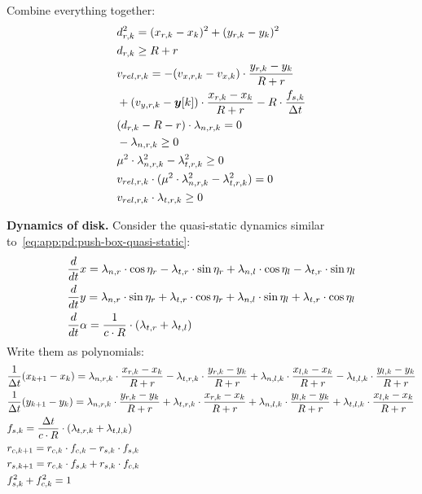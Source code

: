 Combine everything together:
\begin{align}
    & \dr[k]^2 = (\xr[k] - \x[k])^2 + (\yr[k] - \y[k])^2 \\
    & \dr[k] \ge R + r \\
    & \vrelr[k] = -(\vxr[k] - \vx[k]) \cdot \frac{\yr[k] - \y[k]}{R+r} \nonumber \\
    & + (\vyr[k] - \vy[k]) \cdot \frac{\xr[k] - \x[k]}{R+r} 
    - R \cdot \frac{\fs[k]}{\dt} \\
    & (\dr[k] - R - r) \cdot \lam{n,r}[k] = 0 \\
    & -\lam{n,r}[k] \ge 0 \\
    & \mu^2 \cdot \lam{n,r}[k]^2 - \lam{t,r}[k]^2 \ge 0 \\
    & \vrelr[k] \cdot (\mu^2 \cdot \lam{n,r}[k]^2 - \lam{t,r}[k]^2) = 0 \\
    & \vrelr[k] \cdot \lam{t,r}[k] \ge 0 
\end{align}

\textbf{Dynamics of disk.}
Consider the quasi-static dynamics similar to~\eqref{eq:app:pd:push-box-quasi-static}:
\begin{align}
    & \frac{d}{dt} \x = \lam{n,r} \cdot \cos\eta_r - \lam{t,r} \cdot \sin\eta_r + \lam{n,l} \cdot \cos\eta_l - \lam{t,r} \cdot \sin\eta_l \\
    & \frac{d}{dt} \y = \lam{n,r} \cdot \sin\eta_r + \lam{t,r} \cdot \cos\eta_r + \lam{n,l} \cdot \sin\eta_l + \lam{t,r} \cdot \cos\eta_l \\
    & \frac{d}{dt} \alpha = \frac{1}{c \cdot R} \cdot (\lam{t,r} + \lam{t,l})
\end{align}
Write them as polynomials:
\begin{align}
    & \frac{1}{\dt} (\x[k+1] - \x[k]) = \lam{n,r}[k] \cdot \frac{\xr[k] - \x[k]}{R+r} - \lam{t,r}[k] \cdot \frac{\yr[k] - \y[k]}{R+r} 
    + \lam{n,l}[k] \cdot \frac{\xl[k] - \x[k]}{R+r} - \lam{t,l}[k] \cdot \frac{\yl[k] - \y[k]}{R+r} \\
    & \frac{1}{\dt} (\y[k+1] - \y[k]) = \lam{n,r}[k] \cdot \frac{\yr[k] - \y[k]}{R+r} + \lam{t,r}[k] \cdot \frac{\xr[k] - \x[k]}{R+r} 
    + \lam{n,l}[k] \cdot \frac{\yl[k] - \y[k]}{R+r} + \lam{t,l}[k] \cdot \frac{\xl[k] - \x[k]}{R+r} \\
    & \fs[k] = \frac{\dt}{c \cdot R} \cdot (\lam{t,r}[k] + \lam{t,l}[k]) \\
    & \rc[k+1] = \rc[k] \cdot \fc[k] - \rs[k] \cdot \fs[k] \\
    & \rs[k+1] = \rc[k] \cdot \fs[k] + \rs[k] \cdot \fc[k] \\
    & \fs[k]^2 + \fc[k]^2 = 1 
\end{align}


